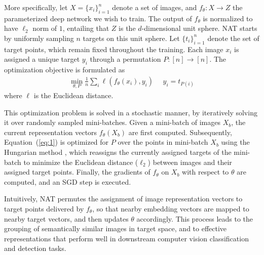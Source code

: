 \documentclass[a4paper,conference]{IEEEtran}
\begin{document}
More specifically, let $X=\{x_i\}_{i=1}^n$ denote a set of images, and $f_\theta:X \rightarrow Z$ the parameterized deep network we wish to train. The output of $f_\theta$ is normalized to have $\ell_2$ norm of $1$, entailing that $Z$ is the $d$-dimensional unit sphere. NAT starts by uniformly sampling $n$ targets on this unit sphere. Let $\{t_i\}_{i=1}^n$ denote the set of target points, which remain fixed throughout the training. Each image $x_i$ is assigned a unique target $y_i$ through a permutation $P:[n]\rightarrow [n]$. The optimization objective is formulated as
\begin{align}\label{eq:1}
\min\limits_{\theta, P} \frac{1}{n} \sum_{i} \ell(f_\theta (x_i), y_i) ~~~~~~
y_i=t_{P(i)}
\end{align}
where $\ell$ is the Euclidean distance.

This optimization problem is solved in a stochastic manner, by iteratively solving it over randomly sampled mini-batches. Given a mini-batch of images $X_b$, the current representation vectors $f_\theta(X_b)$ are first computed. Subsequently, Equation~(\ref{eq:1}) is optimized for $P$ over the points in mini-batch $X_b$ using the Hungarian method \cite{Kuhn55thehungarian}, which reassigns the currently assigned targets of the mini-batch to minimize the Euclidean distance ($\ell_2$) between images and their assigned target points. Finally, the gradients of $f_\theta$ on $X_b$ with respect to $\theta$ are computed, and an SGD step is executed.

Intuitively, NAT permutes the assignment of image representation vectors to target points delivered by $f_\theta$, so that nearby embedding vectors are mapped to nearby target vectors, and then updates $\theta$ accordingly. This process leads to the grouping  of semantically similar images in target space, and to effective representations that perform well in downstream computer vision classification and detection tasks.
\end{document}
